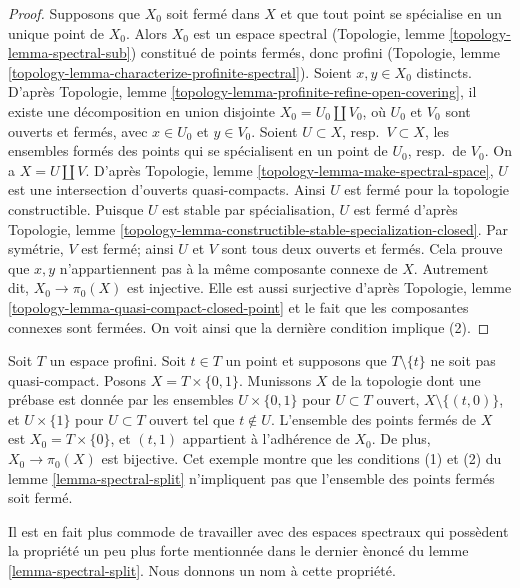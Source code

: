 \begin{proof}
\medskip\noindent
Supposons que $X_0$ soit ferm\'e dans $X$ et que tout point se sp\'ecialise en un unique
point de $X_0$. Alors $X_0$ est un espace spectral
(Topologie, lemme \ref{topology-lemma-spectral-sub})
constitu\'e de points ferm\'es, donc profini
(Topologie, lemme \ref{topology-lemma-characterize-profinite-spectral}).
Soient $x, y \in X_0$ distincts. D'apr\`es
Topologie, lemme \ref{topology-lemma-profinite-refine-open-covering},
il existe une d\'ecomposition en union disjointe
$X_0 = U_0 \amalg V_0$, o\`u $U_0$ et $V_0$ sont ouverts et ferm\'es,
avec $x \in U_0$ et $y \in V_0$.
Soient $U \subset X$, resp.\ $V \subset X$, les ensembles form\'es des points
qui se sp\'ecialisent en un point de $U_0$, resp.\ de $V_0$.
On a $X = U \amalg V$.
D'apr\`es Topologie, lemme \ref{topology-lemma-make-spectral-space},
$U$ est une intersection d'ouverts quasi-compacts.
Ainsi $U$ est ferm\'e pour la topologie constructible.
Puisque $U$ est stable par sp\'ecialisation,
$U$ est ferm\'e d'apr\`es Topologie, lemme
\ref{topology-lemma-constructible-stable-specialization-closed}.
Par sym\'etrie, $V$ est ferm\'e; ainsi $U$ et $V$ sont tous deux
ouverts et ferm\'es.
Cela prouve que $x, y$ n'appartiennent pas \`a la m\^eme composante connexe de $X$.
Autrement dit, $X_0 \to \pi_0(X)$ est injective. Elle est aussi
surjective d'apr\`es
Topologie, lemme \ref{topology-lemma-quasi-compact-closed-point}
et le fait que les composantes connexes sont ferm\'ees.
On voit ainsi que la derni\`ere condition implique (2).
\end{proof}

\begin{example}
\label{example-not-w-local}
Soit $T$ un espace profini. Soit $t \in T$ un point et supposons
que $T \setminus \{t\}$ ne soit pas quasi-compact.
Posons $X = T \times \{0, 1\}$. Munissons $X$ de la topologie
dont une pr\'ebase est donn\'ee par les ensembles
$U \times \{0, 1\}$ pour $U \subset T$ ouvert, $X \setminus \{(t, 0)\}$,
et $U \times \{1\}$ pour $U \subset T$ ouvert tel que $t \not \in U$.
L'ensemble des points ferm\'es de $X$ est $X_0 = T \times \{0\}$, et
$(t, 1)$ appartient \`a l'adh\'erence de $X_0$.
De plus, $X_0 \to \pi_0(X)$ est bijective.
Cet exemple montre que les conditions (1) et (2) du
lemme \ref{lemma-spectral-split} n'impliquent pas que l'ensemble des points ferm\'es
soit ferm\'e.
\end{example}

\noindent
Il est en fait plus commode de travailler avec des espaces
spectraux qui poss\`edent la propri\'et\'e un peu plus forte mentionn\'ee dans
le dernier \`enonc\'e du lemme \ref{lemma-spectral-split}.
Nous donnons un nom \`a cette propri\'et\'e.

